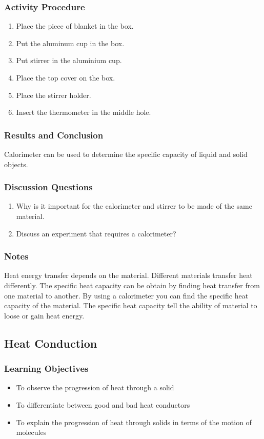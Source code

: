 \subsubsection*{Activity Procedure}
\begin{enumerate}
\item{Place the piece of blanket in the box.}
\item{Put the aluminum cup in the box.}
\item{Put stirrer in the aluminium cup.}
\item{Place the top cover on the box.}
\item{Place the stirrer holder.}
\item{Insert the thermometer in the middle hole.}
\end{enumerate}

\subsubsection*{Results and Conclusion}
Calorimeter can be used to determine the specific capacity of liquid and solid objects.

\subsubsection*{Discussion Questions}
\begin{enumerate}
\item{Why is it important for the calorimeter and stirrer to be made of the same material.}
\item{Discuss an experiment that requires a calorimeter?}
\end{enumerate}

\subsubsection*{Notes}
Heat energy transfer depends on the material. Different materials transfer heat differently. The specific heat capacity can be obtain by finding heat transfer from one material to another. By using a calorimeter 
you can find the specific heat capacity of the material. The specific heat capacity tell the ability of material to loose or gain heat energy.

\subsection{Heat Conduction}

\subsubsection*{Learning Objectives}
\begin{itemize}
\item{To observe the progression of heat through a solid} 
\item{To differentiate between good and bad heat conductors} 
\item{To explain the progression of heat through solids in terms of the motion of molecules} 
\end{itemize}

